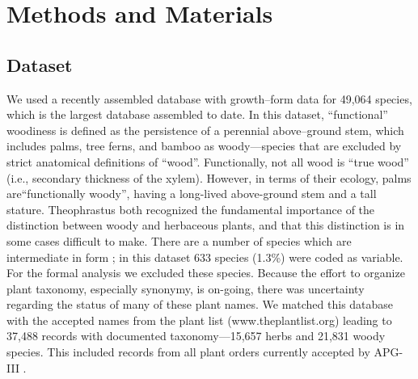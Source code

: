 \documentclass[12pt]{article}
\begin{document}
\section{Methods and Materials}

\subsection{Dataset}

We used a recently assembled database with growth--form data for
49,064 species, which is the largest database assembled to date.  
% 
% 
%
%
In this dataset, ``functional'' woodiness is defined as the persistence of a
perennial above--ground stem, which includes palms, tree ferns, and bamboo as
woody---species that are excluded by strict anatomical definitions of
``wood''.  Functionally, not all wood is ``true wood'' (i.e., secondary thickness of the xylem).  However, in terms of their ecology, palms are``functionally woody'', having a long-lived above-ground stem and a tall stature. Theophrastus both recognized the fundamental importance of the  distinction between woody and herbaceous plants, and that this distinction is in some cases difficult to make.   There are a number of species which are intermediate in form \citep{beaulieuHiddenRates}; in this dataset 633 species (1.3\%) were coded as variable.  For the formal analysis we excluded these species. Because the effort to organize plant taxonomy, especially synonymy, is on-going, there was uncertainty regarding the status of many of these
plant names.  We matched this database with the accepted names from
the plant list (www.theplantlist.org) leading to 37,488 records with documented
taxonomy---15,657 herbs and 21,831 woody species.  This included records from all plant orders currently accepted by APG-III \citep{APG3}.  

\end{document}

